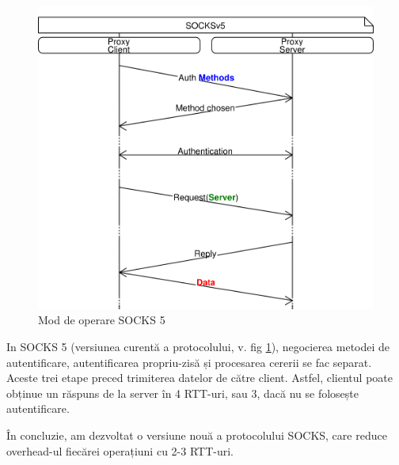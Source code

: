 \begin{figure}[h]
	\centering
	\includegraphics[scale=0.7]{figures/socks/socks5op.png}
	\caption{Mod de operare SOCKS 5}
    	\label{fig:socks5op}
\end{figure}

In SOCKS 5 (versiunea curentă a protocolului, v. fig \ref{fig:socks5op}), negocierea metodei de autentificare, autentificarea propriu-zisă și procesarea cererii se fac separat. Aceste trei etape preced trimiterea datelor de către client. Astfel, clientul poate obținue un răspuns de la server în 4 RTT-uri, sau 3, dacă nu se folosește autentificare.


În concluzie, am dezvoltat o versiune nouă a protocolului SOCKS, care reduce overhead-ul fiecărei operațiuni cu 2-3 RTT-uri.
